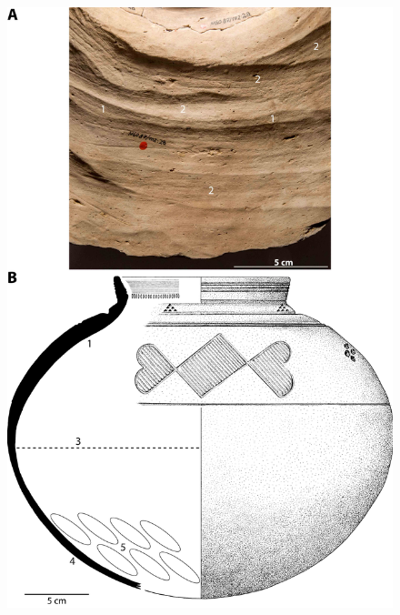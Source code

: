 \documentclass[smallextended,natbib]{svjour3}       %
\begin{document}
\begin{figure}[p]
\begin{minipage}[b]{.48\textwidth}
	\includegraphics[width=\textwidth]{mt_NGO87-102_28-29-01.jpg}
	\end{minipage}
\end{figure}
\end{document}
